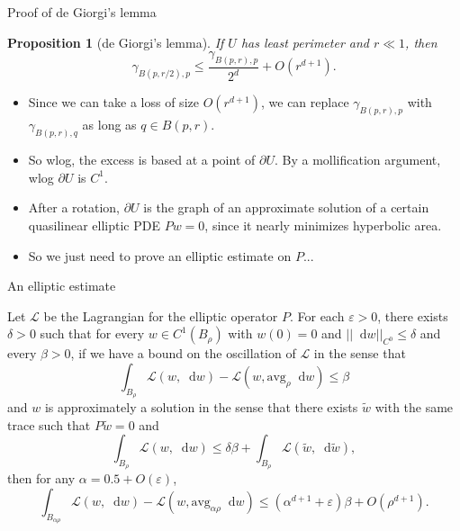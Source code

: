\documentclass[10pt]{beamer}
\newcommand*\dif{\mathop{}\!\mathrm{d}}
\newcommand{\avg}{\mathrm{avg}}
\newtheorem{proposition}{Proposition}
\begin{document}
\begin{frame}{Proof of de Giorgi's lemma}
\begin{proposition}[de Giorgi's lemma]
If $U$ has least perimeter and $r \ll 1$, then
$$\gamma_{B(p, r/2), p} \leq \frac{\gamma_{B(p, r), p}}{2^d} + O(r^{d + 1}).$$
\end{proposition}

\begin{itemize}
\item Since we can take a loss of size $O(r^{d + 1})$, we can replace $\gamma_{B(p, r), p}$ with $\gamma_{B(p, r), q}$ as long as $q \in B(p, r)$.
\item So wlog, the excess is based at a point of $\partial U$. By a mollification argument, wlog $\partial U$ is $C^1$.
\item After a rotation, $\partial U$ is the graph of an approximate solution of a certain quasilinear elliptic PDE $Pw = 0$, since it nearly minimizes hyperbolic area.
\item So we just need to prove an elliptic estimate on $P$...
\end{itemize}
\end{frame}

\begin{frame}{An elliptic estimate}
\begin{lemma}
Let $\mathscr L$ be the Lagrangian for the elliptic operator $P$.
For each $\varepsilon > 0$, there exists $\delta > 0$ such that for every $w \in C^1(B_\rho)$ with $w(0) = 0$ and $||\dif w||_{C^0} \leq \delta$ and every $\beta > 0$, if we have a bound on the oscillation of $\mathscr L$ in the sense that
$$\int_{B_\rho} \mathscr L(w, \dif w) - \mathscr L(w, \avg_\rho \dif w) \leq \beta$$
and $w$ is approximately a solution in the sense that there exists $\tilde w$ with the same trace such that $P\tilde w = 0$ and
$$\int_{B_\rho} \mathscr L(w, \dif w) \leq \delta \beta + \int_{B_\rho} \mathscr L(\tilde w, \dif \tilde w),$$
then for any $\alpha = 0.5 + O(\varepsilon)$,
$$\int_{B_{\alpha \rho}} \mathscr L(w, \dif w) - \mathscr L(w, \avg_{\alpha \rho} \dif w) \leq (\alpha^{d + 1} + \varepsilon) \beta + O(\rho^{d + 1}).$$
\end{lemma}
\end{frame}
\end{document}
